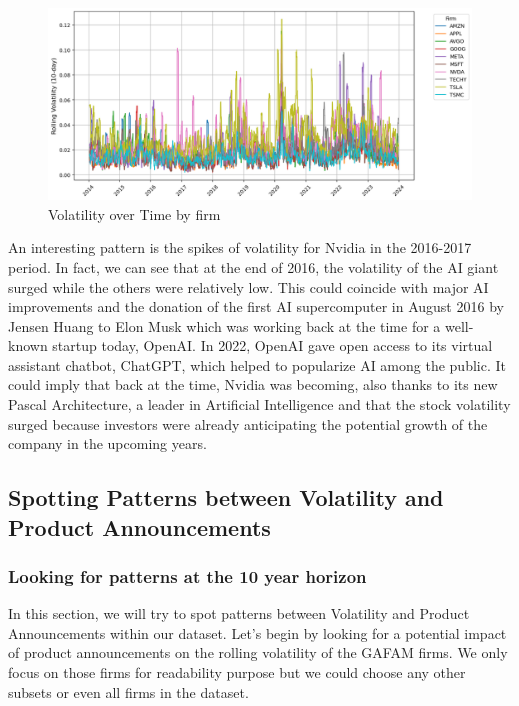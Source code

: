 \documentclass[12pt, oneside]{article}
\begin{document}
\begin{figure}[H]
    \centering
    \includegraphics[width=0.8\linewidth]{../images/volatility_analysis.png}
    \caption{Volatility over Time by firm}
    \label{fig:volatility_analysis}
\end{figure}

An interesting pattern is the spikes of volatility for Nvidia in the 2016-2017 period. In fact, we can see that at the end of 2016, the volatility of the AI giant surged while the others were relatively low. This could coincide with major AI improvements and the donation of the first AI supercomputer in August 2016 by Jensen Huang to Elon Musk which was working back at the time for a well-known startup today, OpenAI. In 2022, OpenAI gave open access to its virtual assistant chatbot, ChatGPT, which helped to popularize AI among the public. It could imply that back at the time, Nvidia was becoming, also thanks to its new Pascal Architecture, a leader in Artificial Intelligence and that the stock volatility surged because investors were already anticipating the potential growth of the company in the upcoming years.

\subsection{Spotting Patterns between Volatility and Product Announcements}

\subsubsection{Looking for patterns at the 10 year horizon}
In this section, we will try to spot patterns between Volatility and Product Announcements within our dataset. Let's begin by looking for a potential impact of product announcements on the rolling volatility of the GAFAM firms. We only focus on those firms for readability purpose but we could choose any other subsets or even all firms in the dataset.
\end{document}
